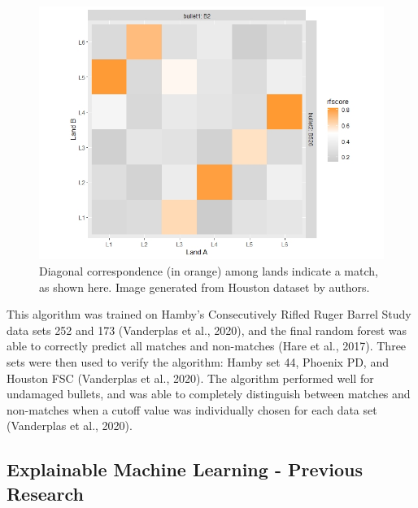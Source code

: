 \documentclass[print]{nuthesis}
\begin{document}
\begin{figure}
\includegraphics[width=\linewidth]{images/Test_Fire_F526} \caption[Diagonal correspondence (in orange) among lands indicate a match.]{Diagonal correspondence (in orange) among lands indicate a match, as shown here. Image generated from Houston dataset by authors.}\label{fig:grid}
\end{figure}

This algorithm was trained on Hamby's Consecutively Rifled Ruger Barrel Study data sets 252 and 173 (Vanderplas et al., 2020), and the final random forest was able to correctly predict all matches and non-matches (Hare et al., 2017).
Three sets were then used to verify the algorithm: Hamby set 44, Phoenix PD, and Houston FSC (Vanderplas et al., 2020).
The algorithm performed well for undamaged bullets, and was able to completely distinguish between matches and non-matches when a cutoff value was individually chosen for each data set (Vanderplas et al., 2020).

\hypertarget{explainable-machine-learning---previous-research}{%
\subsection{Explainable Machine Learning - Previous Research}\label{explainable-machine-learning---previous-research}}
\end{document}
